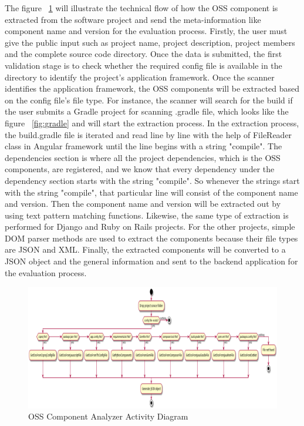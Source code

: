 The figure ~\ref{fig:Analyzer_Activity_Diagram} will illustrate the technical flow of how the \acs{OSS} component is extracted from the software project and send the meta-information like component name and version for the evaluation process. Firstly, the user must give the public input such as project name, project description, project members and the complete source code directory. Once the data is submitted, the first validation stage is to check whether the required config file is available in the directory to identify the project's application framework. Once the scanner identifies the application framework, the \acs{OSS} components will be extracted based on the config file's file type. For instance, the scanner will search for the build if the user submits a Gradle project for scanning .gradle file, which looks like the figure ~\ref{fig:gradle} and will start the extraction process. In the extraction process, the build.gradle file is iterated and read line by line with the help of FileReader class in Angular framework until the line begins with a string "compile". The dependencies section is where all the project dependencies, which is the \acs{OSS} components, are registered, and we know that every dependency under the dependency section starts with the string "compile". So whenever the strings start with the string "compile", that particular line will consist of the component name and version. Then the component name and version will be extracted out by using text pattern matching functions. Likewise, the same type of extraction is performed for Django and Ruby on Rails projects. For the other projects, simple \acs{DOM} parser methods are used to extract the components because their file types are JSON and XML. Finally, the extracted components will be converted to a JSON object and the general information and sent to the backend application for the evaluation process.   

 \begin{figure}[H]
	\includegraphics[width=15cm]{includes/OSS_Analyzer_Activity_Diagram.png}
	\centering
	\caption{\acs{OSS} Component Analyzer Activity Diagram}
	\label{fig:Analyzer_Activity_Diagram}
\end{figure}
